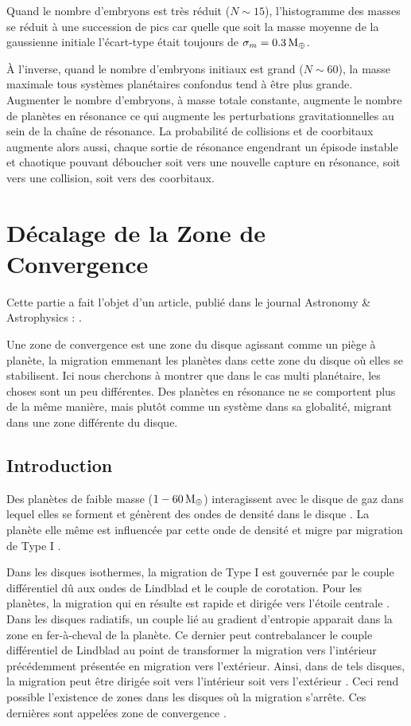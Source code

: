 Quand le nombre d'embryons est très réduit ($N\sim 15$), l'histogramme des masses se réduit à une succession de pics car quelle que soit la masse moyenne de la gaussienne initiale l'écart-type était toujours de $\sigma_m = 0.3\mathrm{\thinspace M_\oplus}$. 

À l'inverse, quand le nombre d'embryons initiaux est grand ($N\sim 60$), la masse maximale tous systèmes planétaires confondus tend à être plus grande. Augmenter le nombre d'embryons, à masse totale constante, augmente le nombre de planètes en résonance ce qui augmente les perturbations gravitationnelles au sein de la chaîne de résonance. La probabilité de collisions et de coorbitaux augmente alors aussi, chaque sortie de résonance engendrant un épisode instable et chaotique pouvant déboucher soit vers une nouvelle capture en résonance, soit vers une collision, soit vers des coorbitaux. 

\section{Décalage de la Zone de Convergence}\label{sec:shifted_CZ}
Cette partie a fait l'objet d'un article, publié dans le journal Astronomy \& Astrophysics : \cite{cossou2013convergence}.

Une zone de convergence est une zone du disque agissant comme un piège à planète, la migration emmenant les planètes dans cette zone du disque où elles se stabilisent. Ici nous cherchons à montrer que dans le cas multi planétaire, les choses sont un peu différentes. Des planètes en résonance ne se comportent plus de la même manière, mais plutôt comme un système dans sa globalité, migrant dans une zone différente du disque.

\subsection{Introduction}
Des planètes de faible masse ($1-60\mathrm{\thinspace M_\oplus}$) interagissent avec le disque de gaz dans lequel elles se forment et génèrent des ondes de densité dans le disque \citep{goldreich1979excitation}. La planète elle même est influencée par cette onde de densité et migre par migration de Type I \citep{ward1997protoplanet}.

Dans les disques isothermes, la migration de Type I est gouvernée par le couple différentiel dû aux ondes de Lindblad et le couple de corotation. Pour les planètes, la migration qui en résulte est rapide et dirigée vers l'étoile centrale \citep{tanaka2002three}. Dans les disques radiatifs, un couple lié au gradient d'entropie apparait dans la zone en fer-à-cheval de la planète. Ce dernier peut contrebalancer le couple différentiel de Lindblad au point de transformer la migration vers l'intérieur précédemment présentée en migration vers l'extérieur. Ainsi, dans de tels disques, la migration peut être dirigée soit vers l'intérieur soit vers l'extérieur \citep{paardekooper2006halting, kley2008migration}. Ceci rend possible l'existence de zones dans les disques où la migration s'arrête. Ces dernières sont appelées zone de convergence \citep[CZs;][]{lyra2010orbital, mordasini2011application, paardekooper2011torque}.

